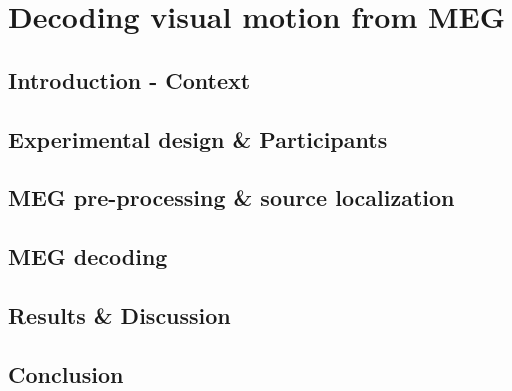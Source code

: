 
\chapter{Decoding visual motion from MEG}
\label{chapter:decoding}
\section{Introduction - Context}
\section{Experimental design \& Participants}
\section{MEG pre-processing \& source localization}
\section{MEG decoding}
\section{Results \& Discussion}
\section{Conclusion}